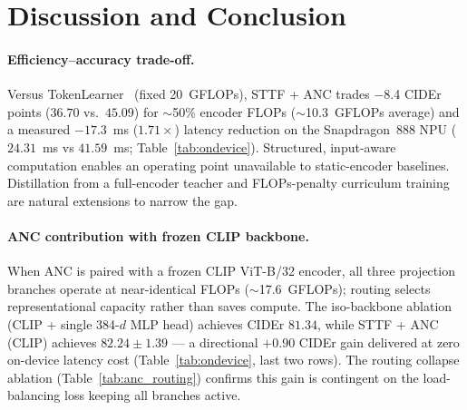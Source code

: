 \documentclass{article}
\begin{document}
\section{Discussion and Conclusion}

\paragraph{Efficiency--accuracy trade-off.}
Versus TokenLearner~\cite{ryoo2021tokenlearner} (fixed 20~GFLOPs), STTF + ANC trades $-$8.4 CIDEr points ($36.70$ vs.\ $45.09$) for $\sim$50\% encoder FLOPs ($\sim$10.3~GFLOPs average) and a measured $-17.3$~ms ($1.71\times$) latency reduction on the Snapdragon~888 NPU ($24.31$~ms vs $41.59$~ms; Table~\ref{tab:ondevice}). Structured, input-aware computation enables an operating point unavailable to static-encoder baselines. Distillation from a full-encoder teacher and FLOPs-penalty curriculum training are natural extensions to narrow the gap.

\paragraph{ANC contribution with frozen CLIP backbone.}
When ANC is paired with a frozen CLIP ViT-B/32 encoder, all three projection branches operate at near-identical FLOPs ($\sim$17.6~GFLOPs); routing selects representational capacity rather than saves compute. The iso-backbone ablation (CLIP + single 384-$d$ MLP head) achieves CIDEr $81.34$, while STTF + ANC (CLIP) achieves $82.24 \pm 1.39$ --- a directional $+0.90$ CIDEr gain delivered at zero on-device latency cost (Table~\ref{tab:ondevice}, last two rows). The routing collapse ablation (Table~\ref{tab:anc_routing}) confirms this gain is contingent on the load-balancing loss keeping all branches active.
\end{document}

